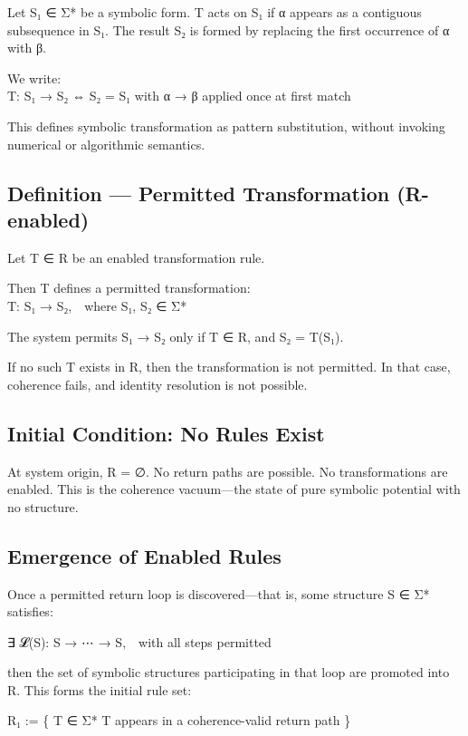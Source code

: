 Let S₁ ∈ Σ* be a symbolic form. T acts on S₁ if α appears as a
contiguous subsequence in S₁. The result S₂ is formed by replacing the
first occurrence of α with β.

We write:\\
T: S₁ → S₂ ⇔ S₂ = S₁ with α → β applied once at first match

This defines symbolic transformation as pattern substitution, without
invoking numerical or algorithmic semantics.

\subsection{Definition --- Permitted Transformation
(R-enabled)}\label{definition-permitted-transformation-r-enabled}

Let T ∈ R be an enabled transformation rule.

Then T defines a permitted transformation:\\
T: S₁ → S₂, where S₁, S₂ ∈ Σ*

The system permits S₁ → S₂ only if T ∈ R, and S₂ = T(S₁).

If no such T exists in R, then the transformation is not permitted. In
that case, coherence fails, and identity resolution is not possible.

\subsection{Initial Condition: No Rules
Exist}\label{initial-condition-no-rules-exist}

At system origin, R = ∅. No return paths are possible. No
transformations are enabled. This is the coherence vacuum---the state of
pure symbolic potential with no structure.

\subsection{Emergence of Enabled
Rules}\label{emergence-of-enabled-rules}

Once a permitted return loop is discovered---that is, some structure S ∈
Σ* satisfies:

∃ 𝓛(S): S → ⋯ → S, with all steps permitted

then the set of symbolic structures participating in that loop are
promoted into R. This forms the initial rule set:

R₁ := \{ T ∈ Σ* \textbar{} T appears in a coherence-valid return path \}

